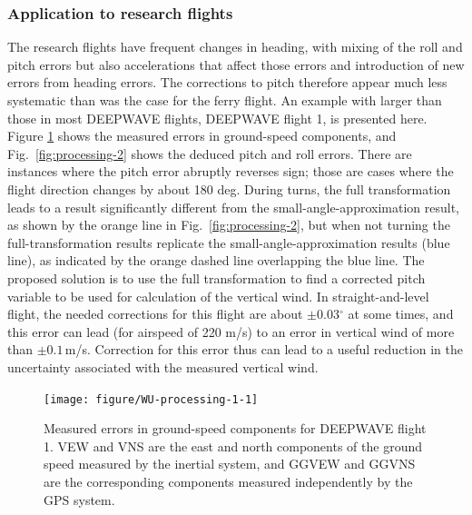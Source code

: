 \documentclass[12pt,twoside,english]{article}\usepackage[]{graphicx}\usepackage[]{color}
\newenvironment{knitrout}{}{} %
\let\OrgIndex\index
\renewcommand*{\index}[1]{\OrgIndex{#1}}
\begin{document}
\subsubsection{Application to research flights\label{sub:Application-to-research}}

The research flights have frequent changes in heading, with mixing of the roll and pitch errors but also accelerations that affect those errors and introduction of new errors from heading errors. The corrections to pitch therefore appear much less systematic than was the case for the ferry flight. An example with larger than those in most DEEPWAVE flights, DEEPWAVE flight 1, is presented here. Figure \ref{fig:processing-1} shows the measured errors in ground-speed components, and Fig.~\ref{fig:processing-2} shows the deduced pitch and roll errors. There are instances where the pitch error abruptly reverses sign; those are cases where the flight direction changes by about 180 deg. During turns, the full transformation leads to a result significantly different from the small-angle-approximation result, as shown by the orange line in Fig.~\ref{fig:processing-2}, but when not turning the full-transformation results replicate the small-angle-approximation results (blue line), as indicated by the orange dashed line overlapping the blue line. The proposed solution is to use the full transformation to find a corrected pitch variable to be used for calculation of the vertical wind. In straight-and-level flight, the needed corrections for this flight are about $\pm$0.03$^{\circ}$ at some times, and this error can lead (for airspeed of 220 m/s) to an error in vertical wind of more than $\pm0.1$\,m/s. Correction for this error thus can lead to a useful reduction in the uncertainty associated with the measured vertical wind. 

\begin{knitrout}\footnotesize
{}\color{fgcolor}\begin{figure}

{\centering \texttt{[image: figure/WU-processing-1-1]} 

}

\caption[Measured errors in ground-speed components for DEEPWAVE flight 1]{Measured errors in ground-speed components for DEEPWAVE flight 1. VEW and VNS are the east and north components of the ground speed measured by the inertial system, and GGVEW and GGVNS are the corresponding components measured independently by the GPS system.}\label{fig:processing-1}
\end{figure}


\end{knitrout}
\end{document}
